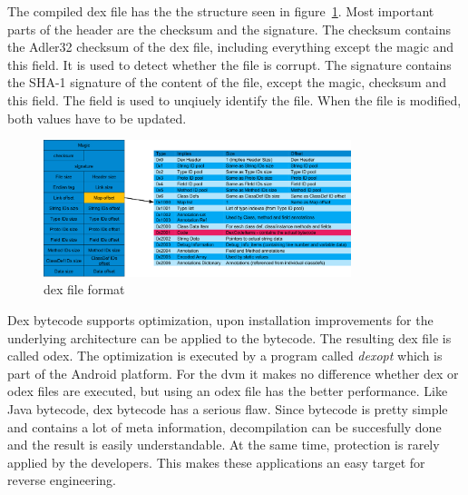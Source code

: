 The compiled \gls{dex} file has the the structure seen in figure~\ref{fig:dex}.
Most important parts of the header are the checksum and the signature.
The checksum contains the Adler32 checksum of the \gls{dex} file, including everything except the magic and this field.
It is used to detect whether the file is corrupt.
The signature contains the SHA-1 signature of the content of the file, except the magic, checksum and this field.
The field is used to unqiuely identify the file.
When the file is modified, both values have to be updated.
\cite{developersDalvik} \cite{ehringerDalvik}
\newline
\begin{figure}[h]
    \centering
    \includegraphics[width=0.8\textwidth]{data/dex.png}
    \caption{\gls{dex} file format \cite{andevconDalvikART}}
    \label{fig:dex}
\end{figure}
Dex bytecode supports optimization, upon installation improvements for the underlying architecture can be applied to the bytecode.
The resulting \gls{dex} file is called \gls{odex}.
The optimization is executed by a program called \textit{dexopt} which is part of the Android platform.
For the \gls{dvm} it makes no difference whether \gls{dex} or \gls{odex} files are executed, but using an \gls{odex} file has the better performance.
\newline
Like Java bytecode, \gls{dex} bytecode has a serious flaw.
Since bytecode is pretty simple and contains a lot of meta information, decompilation can be succesfully done and the result is easily understandable.
At the same time, protection is rarely applied by the developers.
This makes these applications an easy target for reverse engineering.
